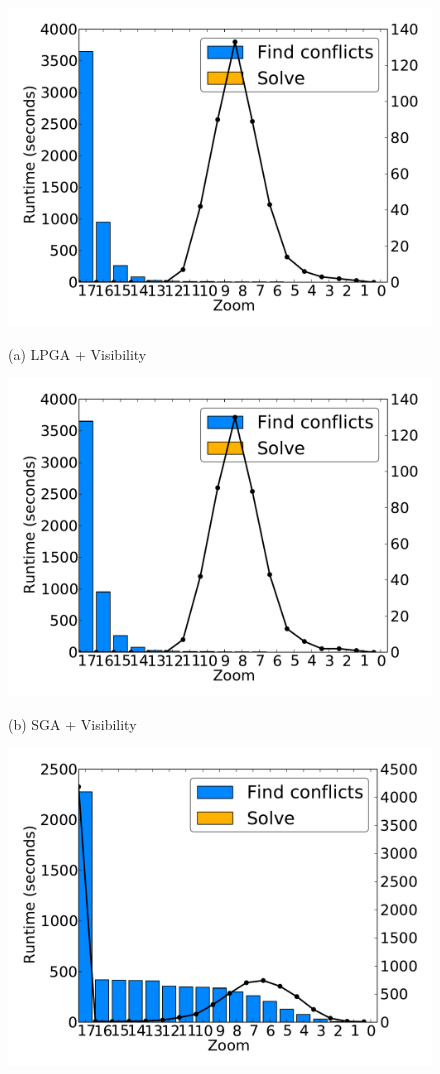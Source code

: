 \documentclass[11pt, oneside]{report}
\begin{document}
\begin{figure}[tb]
  \begin{minipage}{0.329\linewidth}
    \centerline{\includegraphics[width=0.9\linewidth]{./figs-cvl/prelim_lin_30k_uswaterway_lp_A.pdf}}
    \centerline{(a) LPGA + Visibility}
  \end{minipage} \hfill
  \begin{minipage}{0.329\linewidth}
    \centerline{\includegraphics[width=0.9\linewidth]{./figs-cvl/prelim_lin_30k_uswaterway_heuristic_A.pdf}}
    \centerline{(b) SGA + Visibility}
  \end{minipage} \hfill
  \begin{minipage}{0.329\linewidth}
    \centerline{\includegraphics[width=0.9\linewidth]{./figs-cvl/prelim_lin_30k_uswaterway_lp_B.pdf}}

\end{minipage}
\end{figure}
\end{document}
